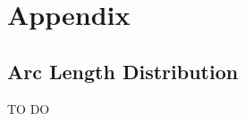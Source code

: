 
\chapter{Appendix}\label{cha:appendix}

\section{Arc Length Distribution}
\label{sec:arcLengthDistribution}
TO DO





